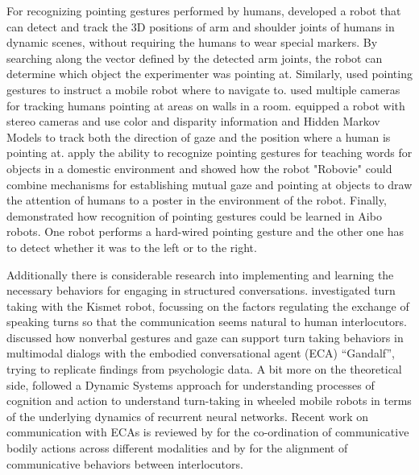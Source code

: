 For recognizing pointing gestures performed by humans,
\cite*{kortenkamp96recognizing} developed a robot that can detect and
track the 3D positions of arm and shoulder joints of humans in dynamic
scenes, without requiring the humans to wear special markers. By
searching along the vector defined by the detected arm joints, the
robot can determine which object the experimenter was pointing
at. Similarly, \cite{martin09estimation} used pointing gestures to
instruct a mobile robot where to navigate to. \cite*{colombo03visual}
used multiple cameras for tracking humans pointing at areas on walls
in a room.  \cite{nickel07visual} equipped a robot with stereo cameras
and use color and disparity information and Hidden Markov Models to
track both the direction of gaze and the position where a human is
pointing at.  \cite{haasch05multi-modal} apply the ability to
recognize pointing gestures for teaching words for objects in a
domestic environment and \cite*{imai03physical} showed how the robot
"Robovie" could combine mechanisms for establishing mutual gaze and
pointing at objects to draw the attention of humans to a poster in the
environment of the robot. Finally, \cite{hafner05learning}
demonstrated how recognition of pointing gestures could be learned in
Aibo robots. One robot performs a hard-wired pointing gesture and the
other one has to detect whether it was to the left or to the right.

Additionally there is considerable research into implementing and
learning the necessary behaviors for engaging in structured
conversations.  \cite{breazeal03sociable} investigated turn taking
with the Kismet robot, focussing on the factors regulating the
exchange of speaking turns so that the communication seems natural to
human interlocutors.  \cite{cassell99turntaking} discussed how
nonverbal gestures and gaze can support turn taking behaviors in
multimodal dialogs with the embodied conversational agent (ECA)
``Gandalf'', trying to replicate findings from psychologic data. A bit
more on the theoretical side, \cite{iizuka03adaptive} followed a
Dynamic Systems approach for understanding processes of cognition and
action \citep{thelen94dynamic} to understand turn-taking in wheeled
mobile robots in terms of the underlying dynamics of recurrent neural
networks. Recent work on communication with ECAs is reviewed by
\cite{kroeger09model} for the co-ordination of communicative bodily
actions across different modalities and by \cite{kopp10social} for the
alignment of communicative behaviors between interlocutors.




